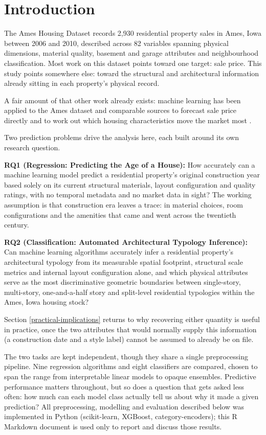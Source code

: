 \documentclass[11pt,a4paper]{article}
\let\oldsection\section
\renewcommand{\section}{\clearpage\oldsection}
\begin{document}
\section{Introduction}\label{introduction}

The Ames Housing Dataset \autocite{DeCock2011} records 2,930 residential
property sales in Ames, Iowa between 2006 and 2010, described across 82
variables spanning physical dimensions, material quality, basement and
garage attributes and neighbourhood classification. Most work on this
dataset points toward one target: sale price. This study points
somewhere else: toward the structural and architectural information
already sitting in each property's physical record.

A fair amount of that other work already exists: machine learning has
been applied to the Ames dataset and comparable sources to forecast sale
price directly and to work out which housing characteristics move the
market most \autocite{ChoyHo2023,HoTangWong2020,JinXu2025}.

Two prediction problems drive the analysis here, each built around its
own research question.

\textbf{RQ1 (Regression: Predicting the Age of a House):} How accurately
can a machine learning model predict a residential property's original
construction year based solely on its current structural materials,
layout configuration and quality ratings, with no temporal metadata and
no market data in sight? The working assumption is that construction era
leaves a trace: in material choices, room configurations and the
amenities that came and went across the twentieth century.

\textbf{RQ2 (Classification: Automated Architectural Typology
Inference):} Can machine learning algorithms accurately infer a
residential property's architectural typology from its measurable
spatial footprint, structural scale metrics and internal layout
configuration alone, and which physical attributes serve as the most
discriminative geometric boundaries between single-story, multi-story,
one-and-a-half story and split-level residential typologies within the
Ames, Iowa housing stock?

Section \ref{practical-implications} returns to why recovering either
quantity is useful in practice, once the two attributes that would
normally supply this information (a construction date and a style label)
cannot be assumed to already be on file.

The two tasks are kept independent, though they share a single
preprocessing pipeline. Nine regression algorithms and eight classifiers
are compared, chosen to span the range from interpretable linear models
to opaque ensembles. Predictive performance matters throughout, but so
does a question that gets asked less often: how much can each model
class actually tell us about why it made a given prediction? All
preprocessing, modelling and evaluation described below was implemented
in Python (scikit-learn, XGBoost, category-encoders); this R Markdown
document is used only to report and discuss those results.
\end{document}
